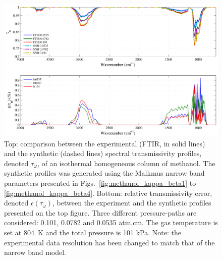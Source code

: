 \begin{figure}[p]
\includegraphics[width=\textwidth]{Figures/Comparison_Fit_Methanol_MALKMUS_Temp804K.pdf}
\caption{Top: comparison between the experimental (FTIR, in solid lines) and the synthetic (dashed lines) spectral transmissivity profiles, denoted $\tau_{\omega}$, of an isothermal homogeneous column of methanol. The synthetic profiles was generated using the Malkmus narrow band parameters presented in Figs.~\ref{fig:methanol_kappa_beta1} to \ref{fig:methanol_kappa_beta4}. Bottom: relative transmissivity error, denoted $\epsilon{(\tau_{\omega})}$, between the experiment and the synthetic profiles presented on the top figure. Three different pressure-paths are considered: 0.101, 0.0782 and 0.0535 atm.cm. The gas temperature is set at 804~K and the total pressure is 101 kPa. Note: the experimental data resolution has been changed to match that of the narrow band model. \label{fig:methanol_SNBVerify_804K}}
\end{figure}

